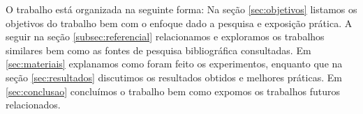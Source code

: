 O trabalho está organizada na seguinte forma: Na seção \ref{sec:objetivos} listamos os objetivos do trabalho bem com o enfoque dado a pesquisa e exposição prática. A seguir na seção \ref{subsec:referencial} relacionamos e exploramos os trabalhos similares bem como as fontes de pesquisa bibliográfica consultadas. Em \ref{sec:materiais} explanamos como foram feito os experimentos, enquanto que na seção \ref{sec:resultados} discutimos os resultados obtidos e melhores práticas. Em \ref{sec:conclusao} concluímos o trabalho bem como expomos os trabalhos futuros relacionados.

